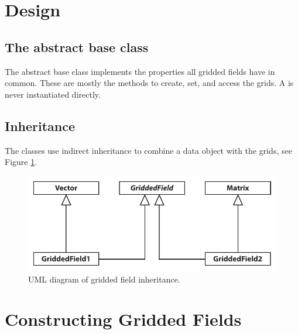 \section{Design}
\label{sec:griddedfields:design}



\subsection{The abstract base class }

The abstract base class  implements the properties
all gridded fields have in common. These are mostly the methods to create,
set, and access the grids. A  is never instantiated
directly.


\subsection{Inheritance}

The  classes use indirect inheritance to combine a
data object with the grids, see Figure \ref{fig:griddedfields:uml}.

\begin{figure}[ht!]
\begin{center}
\includegraphics{Figs/development/griddedfields_inheritance}
\caption{UML diagram of gridded field inheritance.}
\label{fig:griddedfields:uml}
\end{center}
\end{figure}


\section{Constructing Gridded Fields}
\label{sec:griddedfields:construct}


